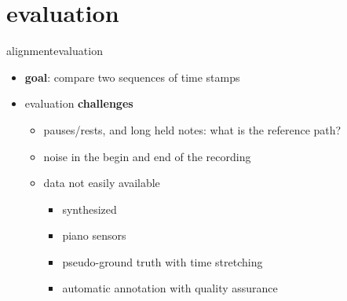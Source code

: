     \section[eval]{evaluation}
        \begin{frame}{alignment}{evaluation}
            \begin{itemize}
                \item   \textbf{goal}: compare two sequences of time stamps
                \bigskip
                \item<2->   evaluation \textbf{challenges} 
                    \begin{itemize}
                    \item   pauses/rests, and long held notes: what is the reference path?
                    \item   noise in the begin and end of the recording
                    \item   data not easily available
                        \begin{itemize}
                            \item   synthesized
                            \item   piano sensors
                            \item   pseudo-ground truth with time stretching
                            \item   automatic annotation with quality assurance
                        \end{itemize}
                    \end{itemize}
             \end{itemize}
        \end{frame}
